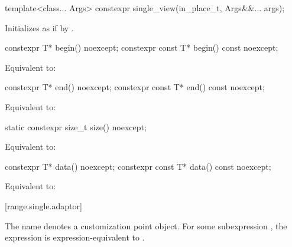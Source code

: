 %
\begin{itemdecl}
template<class... Args>
constexpr single_view(in_place_t, Args&&... args);
\end{itemdecl}

\begin{itemdescr}
\pnum
\effects
Initializes  as if by
.
\end{itemdescr}

%
\begin{itemdecl}
constexpr T* begin() noexcept;
constexpr const T* begin() const noexcept;
\end{itemdecl}

\begin{itemdescr}
\pnum
\effects
Equivalent to: 
\end{itemdescr}

%
\begin{itemdecl}
constexpr T* end() noexcept;
constexpr const T* end() const noexcept;
\end{itemdecl}

\begin{itemdescr}
\pnum
\effects
Equivalent to: 
\end{itemdescr}

%
\begin{itemdecl}
static constexpr size_t size() noexcept;
\end{itemdecl}

\begin{itemdescr}
\pnum
\effects
Equivalent to: 
\end{itemdescr}

%
\begin{itemdecl}
constexpr T* data() noexcept;
constexpr const T* data() const noexcept;
\end{itemdecl}

\begin{itemdescr}
\pnum
\effects
Equivalent to: 
\end{itemdescr}

[range.single.adaptor]{}

\pnum
The name  denotes a
customization point object.
For some subexpression , the expression
 is expression-equivalent to
.

